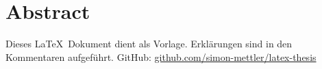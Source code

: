 
\section*{Abstract}

\noindent 
Dieses \LaTeX\  Dokument dient als Vorlage. Erklärungen sind in den Kommentaren aufgeführt. 
GitHub: \href{https://github.com/simon-mettler/latex-thesis}{github.com/simon-mettler/latex-thesis}

\newpage